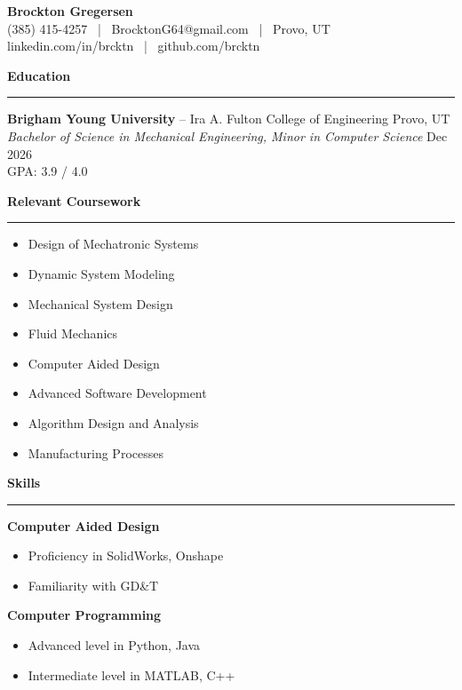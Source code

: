 \documentclass[a4paper,10``pt]{article}
\newcommand{\sectionline}{\noindent\rule{\linewidth}{0.5pt}\vspace{-0.5em}}
\begin{document}
\begin{center}
    {\huge \textbf{Brockton Gregersen}} \\
    (385) 415-4257 \ | \ BrocktonG64@gmail.com \ | \ Provo, UT \\
    linkedin.com/in/brcktn \ | \ github.com/brcktn
\end{center}

\textbf{Education} \vspace{-1em}\\
\sectionline

\textbf{Brigham Young University} -- Ira A. Fulton College of Engineering \hfill Provo, UT \\
\emph{Bachelor of Science in Mechanical Engineering, Minor in Computer Science} \hfill Dec 2026 \\
GPA: 3.9 / 4.0

\textbf{Relevant Coursework} \vspace{-1em}\\
\sectionline
\vspace{-0.5em}
\begin{multicols}{2}
    \begin{itemize}[noitemsep, topsep=0pt]
        \item Design of Mechatronic Systems
        \item Dynamic System Modeling
        \item Mechanical System Design
        \item Fluid Mechanics
    \end{itemize}

    \columnbreak

    \begin{itemize}[noitemsep, topsep=0pt]
        \item Computer Aided Design
        \item Advanced Software Development
        \item Algorithm Design and Analysis
        \item Manufacturing Processes
    \end{itemize}
\end{multicols}

\textbf{Skills} \vspace{-1em}\\
\sectionline
\vspace{-0.5em}
\begin{multicols}{2}
    \textbf{Computer Aided Design}
    \begin{itemize}[noitemsep, topsep=0pt]
        \item Proficiency in SolidWorks, Onshape
        \item Familiarity with GD\&T
    \end{itemize}

    \columnbreak

    \textbf{Computer Programming}
    \begin{itemize}[noitemsep, topsep=0pt]
        \item Advanced level in Python, Java
        \item Intermediate level in MATLAB, C++
    \end{itemize}
\end{multicols}
\end{document}
